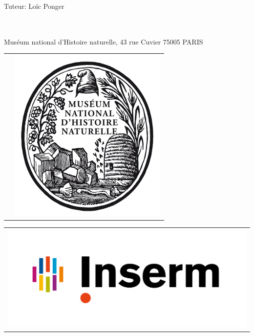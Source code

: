 \documentclass[12pt,a4paper]{article}
\begin{document}
\begin{titlepage}
\begin{sffamily}
\begin{center}
\begin{center}\Large{Tuteur: Lo\"{i}c Ponger}\end{center}~\\%
\\%
Muséum national d'Histoire naturelle, 43 rue Cuvier 75005 PARIS \\ [1cm]

\begin{tabular}{cc}
 \hspace*{2.5cm} &  
\includegraphics[scale=0.2]{img/mnhn.jpg}
\end{tabular}
\hfill
\begin{tabular}{c}
\includegraphics[scale=0.08]{img/inserm.jpg}
\end{tabular}
\hfill
\begin{tabular}{cc}

\end{tabular}
\end{center}
\end{sffamily}
\end{titlepage}
\end{document}
